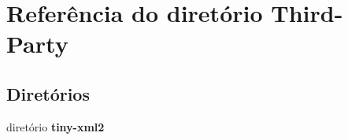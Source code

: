 \section{Referência do diretório Third-\/\+Party}
\label{dir_79b7a6125da4502d30300eee1bf01c07}
\subsection*{Diretórios}
\begin{DoxyCompactItemize}
\item 
diretório {\bf tiny-\/xml2}
\end{DoxyCompactItemize}
